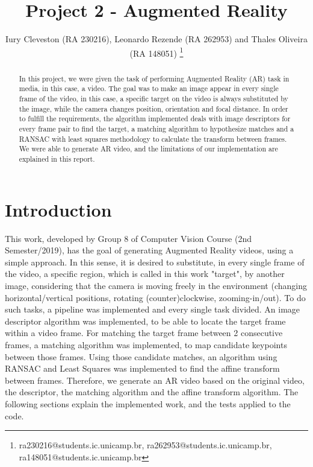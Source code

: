 \documentclass[]{IEEEtran}
\begin{document}
  \title{Project 2 - Augmented Reality}
  \author{Iury Cleveston (RA 230216), Leonardo Rezende (RA 262953) and Thales Oliveira (RA 148051)
    \thanks{ra230216@students.ic.unicamp.br, ra262953@students.ic.unicamp.br, ra148051@students.ic.unicamp.br}
  }
  \maketitle
  
  \begin{abstract}
    In this project, we were given the task of performing Augmented Reality (AR) task in media, in this case, a video. The goal was to make an image appear in every single frame of the video, in this case, a specific target on the video is always substituted by the image, while the camera changes position, orientation and focal distance. In order to fulfill the requirements, the algorithm implemented deals with image descriptors for every frame pair to find the target, a matching algorithm to hypothesize matches and a RANSAC with least squares methodology to calculate the transform between frames. We were able to generate AR video, and the limitations of our implementation are explained in this report.
  \end{abstract}
  
\section{Introduction}
This work, developed by Group 8 of Computer Vision Course (2nd Semester/2019), has the goal of generating Augmented Reality videos, using a simple approach. In this sense, it is desired to substitute, in every single frame of the video, a specific region, which is called in this work "target", by another image, considering that the camera is moving freely in the environment (changing horizontal/vertical positions, rotating (counter)clockwise, zooming-in/out). To do such tasks, a pipeline was implemented and every single task divided. An image descriptor algorithm was implemented, to be able to locate the target frame within a video frame. For matching the target frame between 2 consecutive frames, a matching algorithm was implemented, to map candidate keypoints between those frames. Using those candidate matches, an algorithm using RANSAC and Least Squares was implemented to find the affine transform between frames. Therefore, we generate an AR video based on the original video, the descriptor, the matching algorithm and the affine transform algorithm. The following sections explain the implemented work, and the tests applied to the code.  
\end{document}
